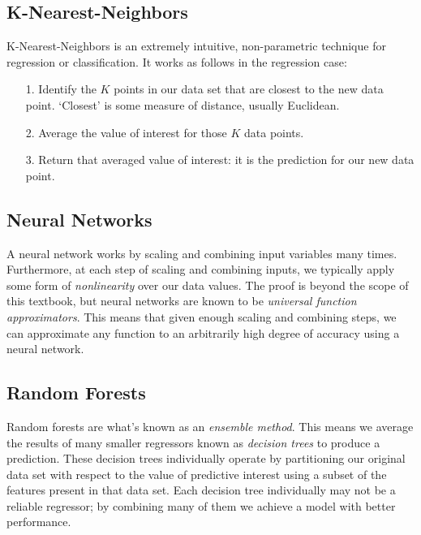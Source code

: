 \subsection{K-Nearest-Neighbors}
K-Nearest-Neighbors is an extremely intuitive, non-parametric technique for regression or classification. It works as follows in the regression case:

\begin{itemize}
    \item[1.] Identify the $K$ points in our data set that are closest to the new data point. `Closest' is some measure of distance, usually Euclidean.
    \item[2.] Average the value of interest for those $K$ data points.
    \item[3.] Return that averaged value of interest: it is the prediction for our new data point.
\end{itemize}


\subsection{Neural Networks}
A neural network works by scaling and combining input variables many times. Furthermore, at each step of scaling and combining inputs, we typically apply some form of \textit{nonlinearity} over our data values. The proof is beyond the scope of this textbook, but neural networks are known to be \textit{universal function approximators}. This means that given enough scaling and combining steps, we can approximate any function to an arbitrarily high degree of accuracy using a neural network.

\subsection{Random Forests}
Random forests are what's known as an \textit{ensemble method}. This means we average the results of many smaller regressors known as \textit{decision trees} to produce a prediction. These decision trees individually operate by partitioning our original data set with respect to the value of predictive interest using a subset of the features present in that data set. Each decision tree individually may not be a reliable regressor; by combining many of them we achieve a model with better performance.

